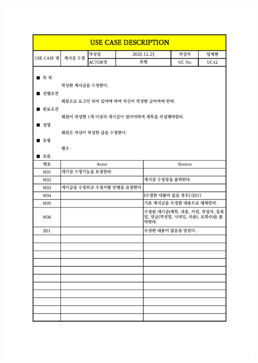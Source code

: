 {{{{{{{{{{{{{{{{{{{{{{{{{{{{{{{{{{{{{{{{{{{{{\includegraphics[width=1.1\textwidth]{./Figure/Design/Display/usecase/042.pdf} \\
}}}}}}}}}}}}}}}}}}}}}}}}}}}}}}}}}}}}}}}}}}}}}

